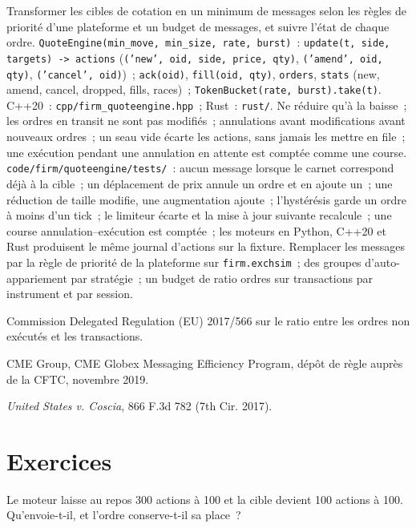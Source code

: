 \begin{build}
 Transformer les cibles de cotation en un minimum de messages selon les règles de priorité d'une plateforme et un budget de messages, et suivre l'état de chaque ordre.
 \texttt{QuoteEngine(min\_move, min\_size, rate, burst)}~: \texttt{update(t, side, targets) -> actions}
(\texttt{('new', oid, side, price, qty)}, \texttt{('amend', oid, qty)}, \texttt{('cancel', oid)})~; \texttt{ack(oid)}, \texttt{fill(oid, qty)}, \texttt{orders}, \texttt{stats}
(new, amend, cancel, dropped, fills, races)~; \texttt{TokenBucket(rate, burst).take(t)}. C++20~: \texttt{cpp/firm\_quoteengine.hpp}~; Rust~:
\texttt{rust/}.
 Ne réduire qu'à la baisse~; les ordres en transit ne sont pas modifiés~; annulations avant modifications avant nouveaux ordres~; un seau vide écarte les actions,
sans jamais les mettre en file~; une exécution pendant une annulation en attente est comptée comme une course.
 \texttt{code/firm/quoteengine/tests/}~: aucun message lorsque le carnet correspond déjà à la cible~; un déplacement de prix annule
un ordre et en ajoute un~; une réduction de taille modifie, une augmentation ajoute~; l'hystérésis garde un ordre à moins d'un tick~; le limiteur écarte et la mise à jour suivante
recalcule~; une course annulation--exécution est comptée~; les moteurs en Python, C++20 et Rust produisent le même journal d'actions sur la fixture.
 Remplacer les messages par la règle de priorité de la plateforme sur \texttt{firm.exchsim}~; des groupes d'auto-appariement par stratégie~; un budget de ratio ordres sur transactions par
instrument et par session.
\end{build}

\begin{omsources}
\item Commission Delegated Regulation (EU) 2017/566 sur le ratio entre les ordres non exécutés et les transactions.
\item CME Group, CME Globex Messaging Efficiency Program, dépôt de règle auprès de la CFTC, novembre 2019.
\item \emph{United States v. Coscia}, 866 F.3d 782 (7th Cir. 2017).
\end{omsources}

\section{Exercices}

\begin{exercise}[$\star$]\label{exo:hf:the-quoting-engine:1}
Le moteur laisse au repos 300 actions à 100 et la cible devient 100 actions à 100. Qu'envoie-t-il, et l'ordre conserve-t-il sa place~?
\end{exercise}

